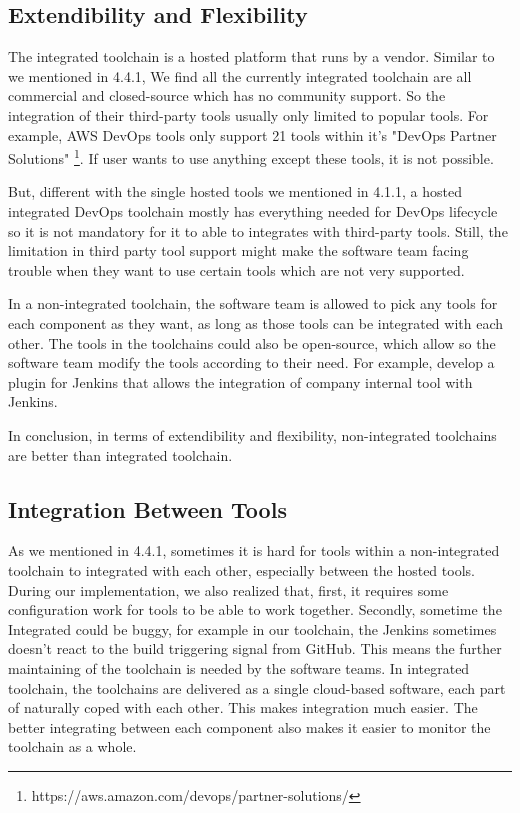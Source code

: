 \subsection{Extendibility and Flexibility}
The integrated toolchain is a hosted platform that runs by a vendor. Similar to we mentioned in 4.4.1, We find all the currently integrated toolchain are all commercial and closed-source which has no community support. So the integration of their third-party tools usually only limited to popular tools. For example, AWS DevOps tools only support 21 tools within it's "DevOps Partner Solutions" \footnote{https://aws.amazon.com/devops/partner-solutions/}. If user wants to use anything except these tools, it is not possible.
\par
But, different with the single hosted tools we mentioned in 4.1.1, a hosted integrated DevOps toolchain mostly has everything needed for DevOps lifecycle so it is not mandatory for it to able to integrates with third-party tools. Still, the limitation in third party tool support might make the software team facing trouble when they want to use certain tools which are not very supported.
\par
In a non-integrated toolchain, the software team is allowed to pick any tools for each component as they want, as long as those tools can be integrated with each other. The tools in the toolchains could also be open-source, which allow so the software team modify the tools according to their need. For example, develop a plugin for Jenkins that allows the integration of company internal tool with Jenkins.
\par
In conclusion, in terms of extendibility and flexibility, non-integrated toolchains are better than integrated toolchain.
\subsection{Integration Between Tools}
As we mentioned in 4.4.1, sometimes it is hard for tools within a non-integrated toolchain to integrated with each other, especially between the hosted tools. 
During our implementation, we also realized that, first, it requires some configuration work for tools to be able to work together. Secondly, sometime the Integrated could be buggy, for example in our toolchain, the Jenkins sometimes doesn't react to the build triggering signal from GitHub. This means the further maintaining of the toolchain is needed by the software teams.
In integrated toolchain, the toolchains are delivered as a single cloud-based software, each part of naturally coped with each other. This makes integration much easier.
The better integrating between each component also makes it easier to monitor the toolchain as a whole.
